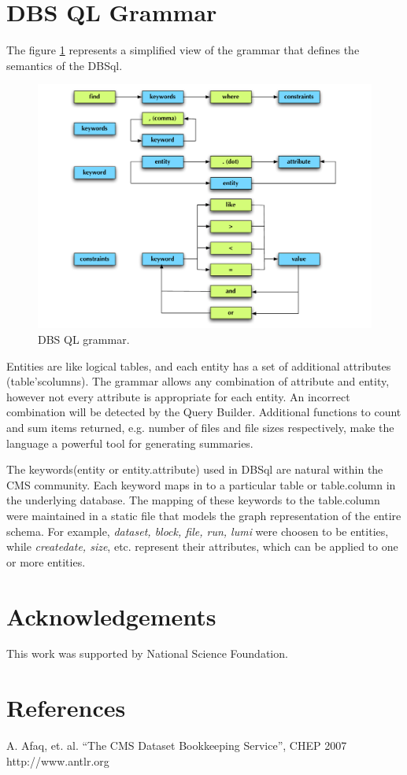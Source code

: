 \documentclass[a4paper]{jpconf}
\begin{document}
\section{DBS QL Grammar}


The figure \ref{Grammar} represents a simplified view of the grammar
that defines the semantics of the DBSql. 
\begin{figure}[htb]
\centering
\includegraphics[width=150mm]{DBSSql_grammar.pdf}
\caption{
DBS QL grammar.
}
\label{Grammar}
\end{figure}


Entities are like logical tables, and each entity has a set of additional 
attributes (table’scolumns). The grammar allows any 
combination of attribute and entity, however not 
every attribute is appropriate for each entity.
An incorrect combination will be detected by the Query Builder. 
Additional functions to count and sum items returned, e.g.
number of files and file sizes respectively,
make the language a powerful tool for generating
summaries. 

The keywords(entity or entity.attribute) used in DBSql 
are natural within the CMS community. Each keyword maps 
in to a particular 
table or table.column in the underlying database. 
The mapping of these keywords to the table.column were
maintained in a static file that models the graph
representation of the entire schema. For example,
{\it dataset, block, file, run, lumi} were choosen
to be entities, while {\it createdate, size}, etc.
represent their attributes, which can be applied to
one or more entities.

\section{Acknowledgements}

This work was supported by National Science Foundation.

\section*{References}
\begin{thebibliography}{9}
 A. Afaq, et. al. ``The CMS Dataset Bookkeeping Service'', CHEP 2007 
 http://www.antlr.org

\end{thebibliography}
\end{document}
